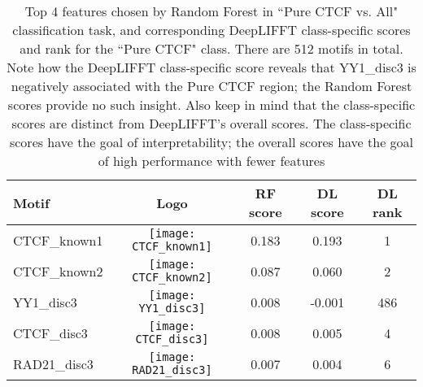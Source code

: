 \documentclass{article}
\begin{document}
\begin{table}[!ht]
\vskip 0.15in
\begin{center}
\begin{small}
\begin{tabular}{lcccc}
\hline
\abovespace\belowspace
Motif & Logo & RF score & DL score & DL rank\\
\hline
\abovespace
\small{CTCF\_known1}    &\texttt{[image: CTCF\_known1]} &  0.183 & 0.193 & 1\\
CTCF\_known2 &\texttt{[image: CTCF\_known2]} &  0.087& 0.060 & 2\\
YY1\_disc3   &\texttt{[image: YY1\_disc3]} &  0.008 & -0.001 & 486\\
CTCF\_disc3    &\texttt{[image: CTCF\_disc3]} &  0.008 & 0.005 & 4\\
RAD21\_disc3     &\texttt{[image: RAD21\_disc3]} &  0.007 & 0.004 & 6\\
\hline
\end{tabular}
\end{small}
\caption{Top 4 features chosen by Random Forest in ``Pure CTCF vs. All" classification task, and corresponding DeepLIFFT class-specific scores and rank for the ``Pure CTCF" class. There are 512 motifs in total. Note how the DeepLIFFT class-specific score reveals that YY1\_disc3 is negatively associated with the Pure CTCF region; the Random Forest scores provide no such insight. Also keep in mind that the class-specific scores are distinct from DeepLIFFT's overall scores. The class-specific scores have the goal of interpretability; the overall scores have the goal of high performance with fewer features}
\label{sample-table}
\end{center}
\vskip -0.1in
\end{table}
\end{document}
